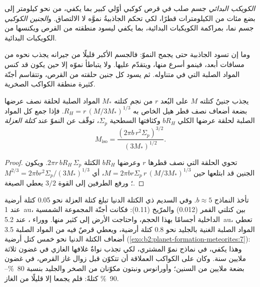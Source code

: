 \begin{definition}
\label{def:b2:planet-formation-meteorites:planetesimal}
\emph{الكويكب البدائي} جسم صلب في قرص كوكبي أوّلي
كبير بما يكفي، من نحو كيلومتر إلى بضع مئات من الكيلومترات قطرًا،
لكي تحكم الجاذبيةُ نموَّه لا الالتصاق. و\emph{الجنين
الكوكبي} جسم نما، بمراكمة
الكويكبات البدائية، بما يكفي ليسود منطقته من القرص
ويكنسها من الكويكبات البدائية.
\end{definition}

وما إن تسود الجاذبية حتى يجمح النموّ: فالجسم الأكبر قليلًا من
جيرانه يجذب  نحوه من مسافات أبعد، فينمو أسرع
منها، ويتقدّم عليها. ولا يتباطأ نموّه إلا حين يكون قد كنس
المواد الصلبة التي في متناوله. ثم يسود كل جنين حلقته من القرص،
وتتقاسم أجنّة كثيرة منطقة الكواكب الصخرية.

\begin{proposition}\label{prop:b2:planet-formation-meteorites:isolation}
يجذب جنينٌ كتلته $M$ على البُعد $r$ من نجم كتلته $M_*$
المواد الصلبة لحلقة نصف عرضها بضعة أضعاف نصف قطر هيل الخاص به
$R_H = r\,(M/3M_*)^{1/3}$. فإذا جمع كل المواد الصلبة لحلقة عرضها الكلي
$bR_H$ وكثافتها السطحية $\Sigma_p$، توقّف عن النموّ عند
\emph{كتلة العزلة}
\[
  M_{\mathrm{iso}} = \frac{(2\pi b\, r^2 \Sigma_p)^{3/2}}{(3M_*)^{1/2}} .
\]
\end{proposition}

\begin{proof}
تحوي الحلقة التي نصف قطرها $r$ وعرضها $bR_H$ الكتلة
$2\pi r\, bR_H\,\Sigma_p$. ويكون الجنين قد ابتلعها حين
$M = 2\pi b r\Sigma_p\, r\,(M/3M_*)^{1/3}$، أي
$M^{2/3} = 2\pi b r^2\Sigma_p/(3M_*)^{1/3}$؛ ورفع الطرفين إلى القوة
$3/2$ يعطي الصيغة.
\end{proof}

تأخذ النماذج $b \approx 5$. وفي السديم ذي الكتلة الدنيا تبلغ كتلة العزلة
نحو \num{0.05} كتلة أرضية عند \qty{1}{au}، بين كتلتي
القمر (\num{0.012}) والمرّيخ (\num{0.11}): فكانت أجنّة المجموعة الشمسية الداخلية
أجسامًا بهذا الحجم، واحتاجت الأرض إلى كثير منها. ووراء ، عند \qty{5.2}{au}، تعطي المواد الصلبة الغنية بالجليد نحو
\num{0.8} كتلة أرضية، ويعطي قرصٌ فيه من المواد الصلبة \num{3.5} أضعاف الكتلة الدنيا
نحو خمس كتل أرضية (\cref{exo:b2:planet-formation-meteorites:7}): وهذا يكفي، في نماذج نموّ
المشتري، لكي تجذب نواةٌ غلافها الغازي في غضون ثلاثة ملايين سنة. وكان على
الكواكب العملاقة أن تتكوّن قبل زوال غاز القرص، في غضون بضعة
ملايين من السنين؛ وأورانوس ونبتون مكوّنان من الصخر والجليد بنسبة \qtyrange{80}{90}{\percent}
كتلةً: فلم يجمعا إلا قليلًا من الغاز.

